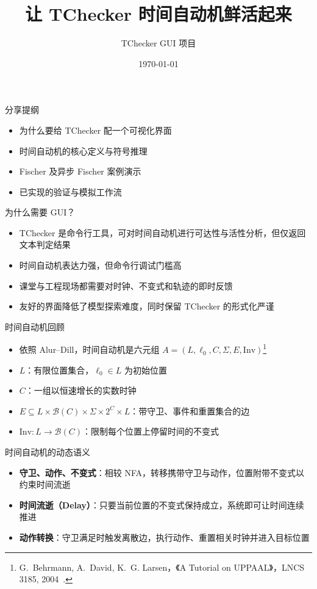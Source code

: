 \documentclass{beamer}
\title{让 TChecker 时间自动机鲜活起来}
\author{TChecker GUI 项目}
\date{\today}
\begin{document}
\begin{frame}
  \titlepage
\end{frame}

\begin{frame}{分享提纲}
  \begin{itemize}
    \item 为什么要给 TChecker 配一个可视化界面
    \item 时间自动机的核心定义与符号推理
    \item Fischer 及异步 Fischer 案例演示
    \item 已实现的验证与模拟工作流
  \end{itemize}
\end{frame}

\begin{frame}{为什么需要 GUI？}
  \begin{itemize}
    \item TChecker 是命令行工具，可对时间自动机进行可达性与活性分析，但仅返回文本判定结果
    \item 时间自动机表达力强，但命令行调试门槛高
    \item 课堂与工程现场都需要对时钟、不变式和轨迹的即时反馈
    \item 友好的界面降低了模型探索难度，同时保留 TChecker 的形式化严谨
  \end{itemize}
\end{frame}

\begin{frame}{时间自动机回顾}
  \begin{itemize}
    \item 依照 Alur--Dill，时间自动机是六元组 \(A = (L, \ell_0, C, \Sigma, E, \mathrm{Inv})\)\footnote{\tiny G.~Behrmann, A.~David, K.~G. Larsen，《A Tutorial on UPPAAL》，LNCS 3185, 2004~\cite{behrmann2004uppaal-cn}.}
    \item \(L\)：有限位置集合，\(\ell_0 \in L\) 为初始位置
    \item \(C\)：一组以恒速增长的实数时钟
    \item \(E \subseteq L \times \mathcal{B}(C) \times \Sigma \times 2^C \times L\)：带守卫、事件和重置集合的边
    \item \(\mathrm{Inv}: L \rightarrow \mathcal{B}(C)\)：限制每个位置上停留时间的不变式
  \end{itemize}
\end{frame}

\begin{frame}{时间自动机的动态语义}
  \begin{itemize}
    \item \textbf{守卫、动作、不变式}：相较 NFA，转移携带守卫与动作，位置附带不变式以约束时间流逝
    \item \textbf{时间流逝（Delay）}：只要当前位置的不变式保持成立，系统即可让时间连续推进
    \item \textbf{动作转换}：守卫满足时触发离散边，执行动作、重置相关时钟并进入目标位置
  \end{itemize}
\end{frame}
\end{document}
